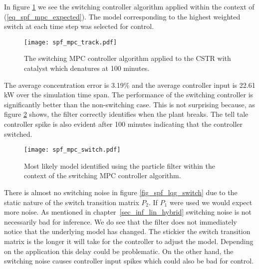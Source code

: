 In figure \ref{fig_spf_mpc_track} we see the switching controller algorithm applied within the context of (\ref{eq_spf_mpc_expected}). The model corresponding to the highest weighted switch at each time step was selected for control.
\begin{figure}[H] 
\centering
\texttt{[image: spf\_mpc\_track.pdf]}
\caption{The switching MPC controller algorithm applied to the CSTR with catalyst which denatures at 100 minutes.}
\label{fig_spf_mpc_track}
\end{figure}
The average concentration error is 3.19\% and the average controller input is 22.61 kW over the simulation time span. The performance of the switching controller is significantly better than the non-switching case. This is not surprising because, as figure \ref{fig_spf_mpc_switch} shows, the filter correctly identifies when the plant breaks. The tell tale controller spike is also evident after 100 minutes indicating that the controller switched.
\begin{figure}[H] 
\centering
\texttt{[image: spf\_mpc\_switch.pdf]}
\caption{Most likely model identified using the particle filter within the context of the switching MPC controller algorithm.}
\label{fig_spf_mpc_switch}
\end{figure}
There is almost no switching noise in figure \ref{fig_spf_lqg_switch} due to the static nature of the switch transition matrix $P_2$. If $P_1$ were used we would expect more noise. As mentioned in chapter~\ref{sec_inf_lin_hybrid} switching noise is not necessarily bad for inference. We do see that the filter does not immediately notice that the underlying model has changed. The stickier the switch transition matrix is the longer it will take for the controller to adjust the model. Depending on the application this delay could be problematic. On the other hand, the switching noise causes controller input spikes which could also be bad for control. 

